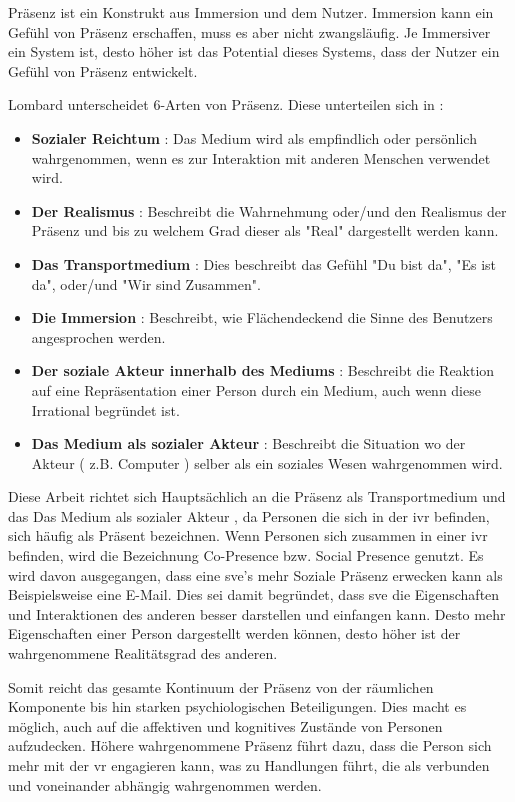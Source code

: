 \documentclass[a4paper,11pt]{article}%
\renewcommand{\\}{\vspace*{0.5\baselineskip} \newline}
\begin{document}
			Präsenz ist ein Konstrukt aus Immersion und dem Nutzer. Immersion kann ein Gefühl von Präsenz erschaffen, muss es aber nicht zwangsläufig. Je Immersiver ein System ist, desto höher ist das Potential dieses Systems, dass der Nutzer ein Gefühl von Präsenz entwickelt.
			
Lombard unterscheidet 6-Arten von Präsenz. Diese unterteilen sich in :
	\begin{itemize}
		\item \textbf{Sozialer Reichtum} : Das Medium wird als empfindlich oder persönlich wahrgenommen, wenn es zur Interaktion mit anderen Menschen verwendet wird.
		\item \textbf{Der Realismus} : Beschreibt die Wahrnehmung oder/und den Realismus der Präsenz und bis zu welchem Grad dieser als "Real" dargestellt werden kann.
		\item \textbf{Das Transportmedium} : Dies beschreibt das Gefühl "Du bist da", "Es ist da", oder/und "Wir sind Zusammen".
		\item \textbf{Die Immersion} : Beschreibt, wie Flächendeckend die Sinne des Benutzers angesprochen werden.
		\item \textbf{Der soziale Akteur innerhalb des Mediums} : Beschreibt die Reaktion auf eine Repräsentation einer Person durch ein Medium, auch wenn diese Irrational begründet ist.
		\item \textbf{Das Medium als sozialer Akteur} : Beschreibt die Situation wo der Akteur ( z.B. Computer ) selber als ein soziales Wesen wahrgenommen wird.					
				\citep{lombard1997heart}
			\end{itemize}
			Diese Arbeit richtet sich Hauptsächlich an die Präsenz als Transportmedium und das \grqq Das Medium als sozialer Akteur \glqq, da Personen die sich in der \ac{ivr} befinden, sich häufig als \grqq Präsent \glqq bezeichnen. Wenn Personen sich zusammen in einer \ac{ivr} befinden,  wird die Bezeichnung \grqq Co-Presence bzw. Social Presence \glqq genutzt. \citep{schuemie2001research}\\
			Es wird davon ausgegangen, dass eine \ac{sve}'s mehr Soziale Präsenz erwecken kann als Beispielsweise eine E-Mail. Dies sei damit begründet, dass \ac{sve} die Eigenschaften und Interaktionen des anderen besser darstellen und einfangen kann. Desto mehr Eigenschaften einer Person dargestellt werden können, desto höher ist der wahrgenommene Realitätsgrad des anderen. \citep[p. 5-8]{biocca2002defining}
			
Somit reicht das gesamte Kontinuum der Präsenz von der räumlichen Komponente bis hin starken psychiologischen Beteiligungen. Dies macht es möglich, auch auf die affektiven und kognitives Zustände von Personen aufzudecken. Höhere wahrgenommene Präsenz führt dazu, dass die Person sich mehr mit der \ac{vr} engagieren kann, was zu Handlungen führt, die als verbunden und voneinander abhängig wahrgenommen werden. \citep{biocca2001criteria}
\end{document}
